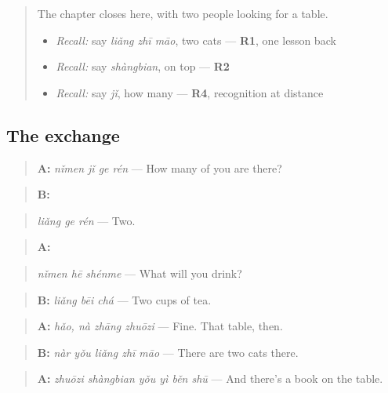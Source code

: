 \label{lesson:ZH-C88-practice}



\begin{quote}
The chapter closes here, with two people looking for a table.

\begin{itemize}
\raggedright
  \item \emph{Recall:} say \emph{liǎng zhī māo}, two cats — \textbf{R1}, one lesson back
  \item \emph{Recall:} say \emph{shàngbian}, on top — \textbf{R2}
  \item \emph{Recall:} say \emph{jǐ}, how many — \textbf{R4}, recognition at distance
\end{itemize}
\end{quote}

\subsection*{The exchange}
\begin{quote}
\textbf{A:} \emph{nǐmen jǐ ge rén} — How many of you are there?
\end{quote}

\begin{quote}
\textbf{B:} 
\end{quote}

\begin{quote}
\emph{liǎng ge rén} — Two.
\end{quote}

\begin{quote}
\textbf{A:} 
\end{quote}

\begin{quote}
\emph{nǐmen hē shénme} — What will you drink?
\end{quote}

\begin{quote}
\textbf{B:} \emph{liǎng bēi chá} — Two cups of tea.
\end{quote}

\begin{quote}
\textbf{A:} \emph{hǎo, nà zhāng zhuōzi} — Fine. That table, then.
\end{quote}

\begin{quote}
\textbf{B:} \emph{nàr yǒu liǎng zhī māo} — There are two cats there.
\end{quote}

\begin{quote}
\textbf{A:} \emph{zhuōzi shàngbian yǒu yì běn shū} — And there's a book on the table.
\end{quote}

